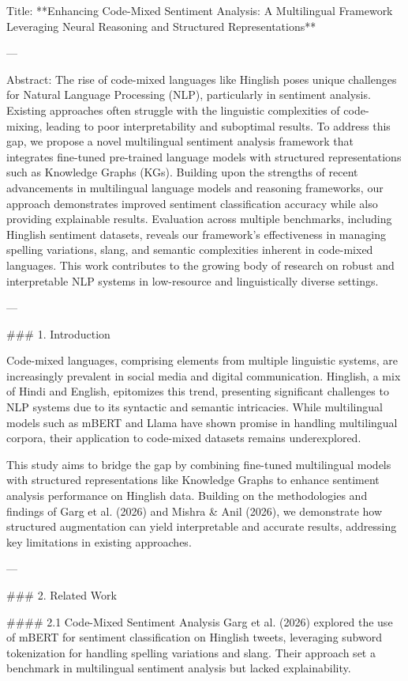 Title: **Enhancing Code-Mixed Sentiment Analysis: A Multilingual Framework Leveraging Neural Reasoning and Structured Representations**

---

Abstract:  
The rise of code-mixed languages like Hinglish poses unique challenges for Natural Language Processing (NLP), particularly in sentiment analysis. Existing approaches often struggle with the linguistic complexities of code-mixing, leading to poor interpretability and suboptimal results. To address this gap, we propose a novel multilingual sentiment analysis framework that integrates fine-tuned pre-trained language models with structured representations such as Knowledge Graphs (KGs). Building upon the strengths of recent advancements in multilingual language models and reasoning frameworks, our approach demonstrates improved sentiment classification accuracy while also providing explainable results. Evaluation across multiple benchmarks, including Hinglish sentiment datasets, reveals our framework's effectiveness in managing spelling variations, slang, and semantic complexities inherent in code-mixed languages. This work contributes to the growing body of research on robust and interpretable NLP systems in low-resource and linguistically diverse settings.

---

### 1. Introduction

Code-mixed languages, comprising elements from multiple linguistic systems, are increasingly prevalent in social media and digital communication. Hinglish, a mix of Hindi and English, epitomizes this trend, presenting significant challenges to NLP systems due to its syntactic and semantic intricacies. While multilingual models such as mBERT and Llama have shown promise in handling multilingual corpora, their application to code-mixed datasets remains underexplored.

This study aims to bridge the gap by combining fine-tuned multilingual models with structured representations like Knowledge Graphs to enhance sentiment analysis performance on Hinglish data. Building on the methodologies and findings of Garg et al. (2026) and Mishra & Anil (2026), we demonstrate how structured augmentation can yield interpretable and accurate results, addressing key limitations in existing approaches.

---

### 2. Related Work

#### 2.1 Code-Mixed Sentiment Analysis  
Garg et al. (2026) explored the use of mBERT for sentiment classification on Hinglish tweets, leveraging subword tokenization for handling spelling variations and slang. Their approach set a benchmark in multilingual sentiment analysis but lacked explainability.  

